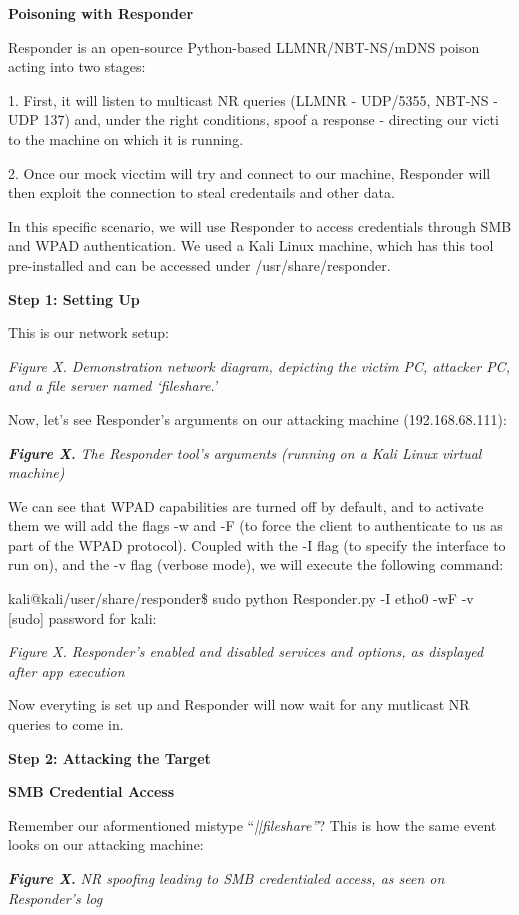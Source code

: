 \textbf{Poisoning with Responder}

Responder is an open-source Python-based LLMNR/NBT-NS/mDNS poison acting into two stages: 

1. First, it will listen to multicast NR queries (LLMNR - UDP/5355, NBT-NS - UDP 137) and, under the right conditions, spoof a response - directing our victi to the machine on which it is running.

2. Once our mock vicctim will try and connect to our machine, Responder will then exploit the connection to steal credentails and other data.

In this specific scenario, we will use Responder to access credentials through SMB and WPAD authentication. We used a Kali Linux machine, which has this tool pre-installed and can be accessed under /usr/share/responder.

\textbf{Step 1: Setting Up}

This is our network setup:

\textit{Figure X. Demonstration network diagram, depicting the victim PC, attacker PC, and a file server named ‘fileshare.’}

Now, let’s see Responder’s arguments on our attacking machine (192.168.68.111):

\textit{\textbf{Figure X.}}\textit{ The Responder tool’s arguments (running on a Kali Linux virtual machine)}

We can see that WPAD capabilities are turned off by default, and to activate them we will add the flags -w and -F (to force the client to authenticate to us as part of the WPAD protocol). Coupled with the -I flag (to specify the interface to run on), and the -v flag (verbose mode), we will execute the following command:

kali@kali/user/share/responder\$ sudo python Responder.py -I etho0 -wF -v [sudo] password for kali:

\textit{Figure X. Responder’s enabled and disabled services and options, as displayed after app execution}

Now everyting is set up and Responder will now wait for any mutlicast NR queries to come in.

\textbf{Step 2: Attacking the Target}

\textbf{SMB Credential Access}

Remember our aformentioned mistype “\textit{||fileshare”}? This is how the same event looks on our attacking machine:

\textit{\textbf{Figure X. }}\textit{NR spoofing leading to SMB credentialed access, as seen on Responder’s log}

